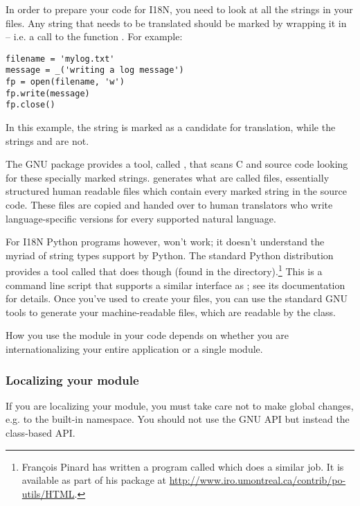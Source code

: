In order to prepare your code for I18N, you need to look at all the
strings in your files.  Any string that needs to be translated
should be marked by wrapping it in  -- i.e. a call to
the function \function{_()}.  For example:

\begin{verbatim}
filename = 'mylog.txt'
message = _('writing a log message')
fp = open(filename, 'w')
fp.write(message)
fp.close()
\end{verbatim}

In this example, the string  is marked as
a candidate for translation, while the strings  and
 are not.

The GNU  package provides a tool, called
, that scans C and \Cpp{} source code looking for these
specially marked strings.   generates what are
called  files, essentially structured human readable files
which contain every marked string in the source code.  These
 files are copied and handed over to human translators who write
language-specific versions for every supported natural language.

For I18N Python programs however,  won't work; it
doesn't understand the myriad of string types support by Python.  The
standard Python distribution provides a tool called
 that does though (found in the 
directory).\footnote{Fran\c cois Pinard has written a program called
 which does a similar job.  It is available as part of
his  package at
\url{http://www.iro.umontreal.ca/contrib/po-utils/HTML}.
}  This is a command line script that
supports a similar interface as ; see its
documentation for details.  Once you've used  to
create your  files, you can use the standard GNU
 tools to generate your machine-readable 
files, which are readable by the  class.

How you use the  module in your code depends on
whether you are internationalizing your entire application or a single
module.

\subsubsection{Localizing your module}

If you are localizing your module, you must take care not to make
global changes, e.g. to the built-in namespace.  You should not use
the GNU  API but instead the class-based API.  


